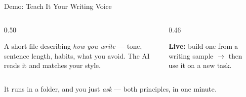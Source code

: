 \documentclass[aspectratio=169, 10pt]{beamer}
\begin{document}
\begin{frame}{Demo: Teach It Your Writing Voice}
\vskip2pt
\begin{columns}[T]
\begin{column}{0.50\textwidth}
\begin{tcolorbox}[keybox, title={\faMicrophone\quad A ``voice file''}]
\small A short file describing \emph{how you write} --- tone, sentence length, habits, what you avoid. The AI reads it and matches your style.
\end{tcolorbox}
\end{column}
\begin{column}{0.46\textwidth}
\begin{tcolorbox}[accentbox]
\small \textbf{Live:} build one from a writing sample $\rightarrow$ then use it on a new task.
\end{tcolorbox}
\end{column}
\end{columns}
\vskip8pt
\begin{tcolorbox}[quotebox, halign=center, top=3pt, bottom=3pt]
\small It runs in a folder, and you just \emph{ask} --- both principles, in one minute.
\end{tcolorbox}
\end{frame}


%
\end{document}
